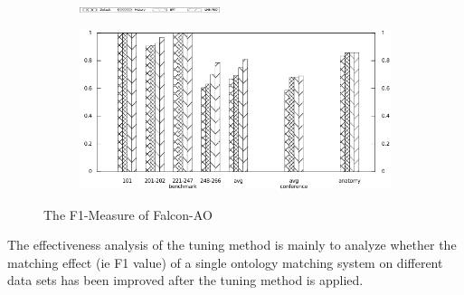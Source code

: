 \documentclass[twoside]{article}
\begin{document}
\begin{figure}[htb!]
\centering
\begin{subfigure}{\textwidth}
\centering
\includegraphics[width=0.45\textwidth]{figures/legend.pdf}
\end{subfigure}

\begin{subfigure}{0.5\textwidth}
	\centering
	\includegraphics[width=\textwidth]{data_figs/Falcon-AO_F1-Measure.pdf}
\end{subfigure}
\caption{The F1-Measure of Falcon-AO}
\label{fig:Falcon-AO_F1-Measure}
\end{figure}

The effectiveness analysis of the tuning method is mainly to analyze whether the matching effect (ie F1 value) of a single ontology matching system on different data sets has been improved after the tuning method is applied.
\end{document}
